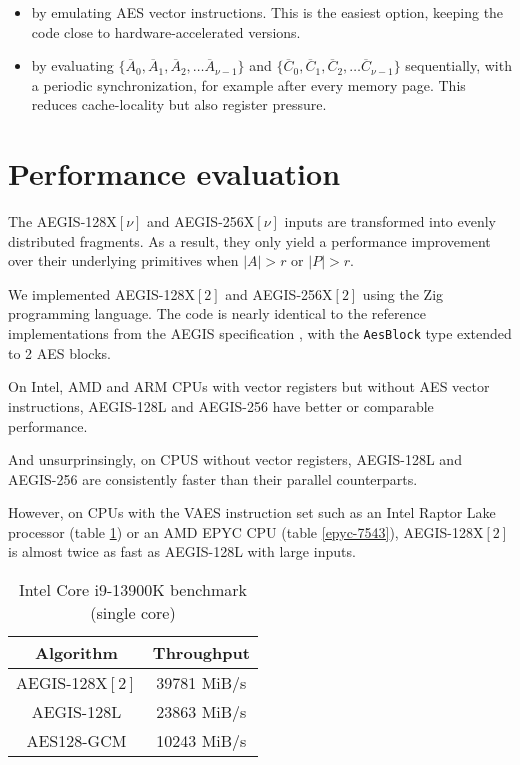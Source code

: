 \documentclass[envcountsame,runningheads,notitlepage]{llncs}
\begin{document}
\begin{itemize}
  \item by emulating AES vector instructions. This is the easiest option, keeping the code close to hardware-accelerated versions.
  \item by evaluating $\{ \overline{A}_0, \overline{A}_1, \overline{A}_2, \ldots \overline{A}_{\nu-1} \}$ and $\{ \overline{C}_0, \overline{C}_1, \overline{C}_2, \ldots \overline{C}_{\nu-1} \}$ sequentially, with a periodic synchronization, for example after every memory page. This reduces cache-locality but also register pressure.
\end{itemize}

\section{Performance evaluation}
\label{sec:performance evaluation}

The AEGIS-128X$[\nu]$ and AEGIS-256X$[\nu]$ inputs are transformed into evenly distributed fragments.
As a result, they only yield a performance improvement over their underlying primitives when $\lvert A \rvert > r$ or $\lvert P \rvert > r$.

We implemented AEGIS-128X$[2]$ and AEGIS-256X$[2]$ using the Zig programming language. The code \cite{GitHub:AEGISX} is nearly identical to the reference implementations from the AEGIS specification \cite{DSL2023}, with the \lstinline{AesBlock} type extended to 2 AES blocks.

On Intel, AMD and ARM CPUs with vector registers but without AES vector instructions, AEGIS-128L and AEGIS-256 have better or comparable performance.

And unsurprinsingly, on CPUS without vector registers, AEGIS-128L and AEGIS-256 are consistently faster than their parallel counterparts.

However, on CPUs with the VAES instruction set such as an Intel Raptor Lake processor (table \ref{i9-13900K}) or an AMD EPYC CPU (table \ref{epyc-7543}), AEGIS-128X$[2]$ is almost twice as fast as AEGIS-128L with large inputs.

\begin{table}
  \begin{center}
    \begin{tabular}{|c|c|}
      \hline
      Algorithm       & Throughput  \\
      \hline
      AEGIS-128X$[2]$ & 39781 MiB/s \\
      \hline
      AEGIS-128L      & 23863 MiB/s \\
      \hline
      AES128-GCM      & 10243 MiB/s \\
      \hline
    \end{tabular}
    \caption{\label{i9-13900K}Intel Core i9-13900K benchmark (single core)}
  \end{center}
\end{table}
\end{document}
